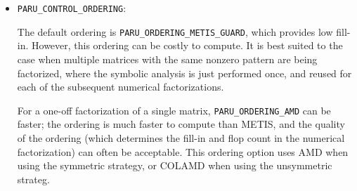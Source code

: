 \documentclass[12pt]{article}
\begin{document}
\begin{itemize}
\begin{itemize}
            The {\em symmetry} $\sigma$ of ${S}$ is defined as the number of
            {\em matched} off-diagonal entries, divided by the total number of
            off-diagonal entries.  An entry $s_{ij}$ is matched if $s_{ji}$ is
            also an entry.  They need not be numerically equal.  An {\em entry}
            is a value in $A$ which is present in the input data structure.
            All nonzeros are entries, but some entries may be numerically zero.

            A {\em row singleton} is an entry $a_{ij}$ with a single entry in
            the $i$th row of the matrix $A$.  A {\em column singleton} is an
            entry $a_{ij}$ with a single entry in the $j$th column of the
            matrix $A$.  When a singleton $a_{ij}$ is found, row $i$ and column
            $j$ are removed and the process repeats.  In the final pruned
            matrix, all rows and columns have at least two entries.

        \item \verb'UMFPACK_STRATEGY_UNSYMMETRIC': UMFPACK will order columns
            of the matrix $A'A$ via COLAMD or METIS.

        \item \verb'UMFPACK_STRATEGY_SYMMETRIC': UMFPACK will order the columns
            of the matrix $A+A'$ via AMD or METIS.

        \end{itemize}

    \item \verb'PARU_CONTROL_ORDERING': %

        The default ordering is \verb'PARU_ORDERING_METIS_GUARD', which provides
        low fill-in.  However, this ordering can be costly to compute.  It is
        best suited to the case when multiple matrices with the same nonzero
        pattern are being factorized, where the symbolic analysis is just
        performed once, and reused for each of the subsequent numerical
        factorizations.

        For a one-off factorization of a single matrix,
        \verb'PARU_ORDERING_AMD' can be faster; the ordering is much faster to
        compute than METIS, and the quality of the ordering (which determines
        the fill-in and flop count in the numerical factorization) can often be
        acceptable.  This ordering option uses AMD when using the symmetric
        strategy, or COLAMD when using the unsymmetric strateg.


\end{itemize}
\end{document}
